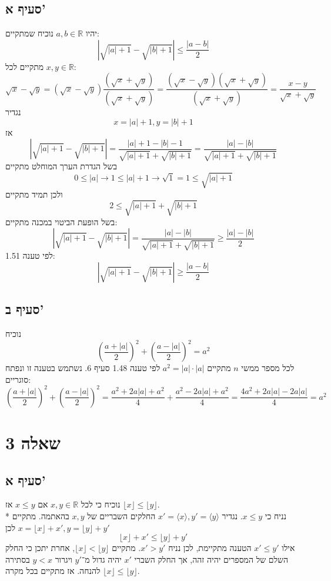 \documentclass[a4paper]{article}
\def\RR{\mathbb{R}}
\begin{document}
\subsection{סעיף א'}
יהיו $a, b \in \RR$ נוכיח שמתקיים:
\[
	\left| \sqrt{\left| a \right| + 1} - \sqrt{\left| b \right| + 1} \right| \le \frac{|a - b|}{2}
\]
מתקיים לכל $x, y \in \RR$:
\[
	\sqrt{x} - \sqrt{y}
	= (\sqrt{x} - \sqrt{y}) \frac{(\sqrt{x} + \sqrt{y})}{(\sqrt{x} + \sqrt{y})}
	= \frac{(\sqrt{x} - \sqrt{y}) (\sqrt{x} + \sqrt{y})}{(\sqrt{x} + \sqrt{y})}
	= \frac{x - y}{\sqrt{x} + \sqrt{y}}
\]
נגדיר
\[
	x = |a| + 1, y = |b| + 1
\]
אז
\[
	\left| \sqrt{\left| a \right| + 1} - \sqrt{\left| b \right| + 1} \right|
	= \frac{|a| + 1 - |b| - 1}{\sqrt{\left| a \right| + 1} + \sqrt{\left| b \right| + 1}}
	= \frac{|a| - |b|}{\sqrt{\left| a \right| + 1} + \sqrt{\left| b \right| + 1}}
\]
בשל הגדרת הערך המוחלט מתקיים
\[
	0 \le |a| \rightarrow 1 \le |a| + 1 \rightarrow \sqrt{1} = 1 \le \sqrt{|a| + 1}
\]
ולכן תמיד מתקיים
\[
	2 \le \sqrt{\left| a \right| + 1} + \sqrt{\left| b \right| + 1}
\]
בשל הופעת הביטוי במכנה מתקיים:
\[
	\left| \sqrt{\left| a \right| + 1} - \sqrt{\left| b \right| + 1} \right| = 
	\frac{|a| - |b|}{\sqrt{\left| a \right| + 1} + \sqrt{\left| b \right| + 1}}
	\ge \frac{|a| - |b|}{2}
\]
לפי טענה 1.51:
\[
	\left| \sqrt{\left| a \right| + 1} - \sqrt{\left| b \right| + 1} \right|
	\ge \frac{|a - b|}{2}
\]

\subsection{סעיף ב'}
נוכיח
\[
	{\left( \frac{a + |a|}{2} \right)}^2
	+ {\left( \frac{a - |a|}{2} \right)}^2
	= a^2
\]
לכל מספר ממשי $n$ מתקיים $a^2 = |a| \cdot |a|$
לפי טענה 1.48 סעיף 6. נשתמש בטענה זו ונפתח סוגריים:
\[
	{\left( \frac{a + |a|}{2} \right)}^2
	+ {\left( \frac{a - |a|}{2} \right)}^2
	=
	\frac{a^2 + 2 a |a| + a^2}{4}
	+ \frac{a^2 - 2 a |a| + a^2}{4}
	=
	\frac{4 a^2 + 2 a |a| - 2 a |a|}{4}
	= a^2
\]

\section{שאלה 3}
\subsection{סעיף א'}
נוכיח כי לכל $x, y \in \RR$ אם $x \le y$ אז $\lfloor x \rfloor \le \lfloor y \rfloor$. \\*
נניח כי $x \le y$. נגדיר $x' = \langle x \rangle, y' = \langle y \rangle$ החלקים השבריים של $x, y$ בהאתמה.
מתקיים $x = \lfloor x \rfloor + x', y = \lfloor y \rfloor + y'$ לכן
\[
	\lfloor x \rfloor + x' \le \lfloor y \rfloor + y'
\]
אילו $x' \le y'$ הטענה מתקיימת, לכן נניח $x' > y'$.
מתקיים $\lfloor x \rfloor < \lfloor y \rfloor$, אחרת יתכן כי החלק השלם של המספרים יהיה זהה, אך החלק השברי $x'$ יהיה גדול מ־$y'$ ויגרור $y < x$ בסתירה להנחה.
אז מתקיים בכל מקרה $\lfloor x \rfloor \le \lfloor y \rfloor$.
\end{document}
